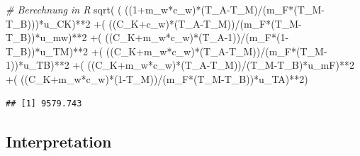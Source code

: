 \documentclass[class=article, crop=false]{standalone}
\newenvironment{Shaded}{\begin{snugshade}}{\end{snugshade}}
\newcommand{\CommentTok}[1]{\textcolor[rgb]{0.56,0.35,0.01}{\textit{#1}}}
\newcommand{\DecValTok}[1]{\textcolor[rgb]{0.00,0.00,0.81}{#1}}
\newcommand{\FunctionTok}[1]{\textcolor[rgb]{0.00,0.00,0.00}{#1}}
\newcommand{\NormalTok}[1]{#1}
\newcommand{\SpecialCharTok}[1]{\textcolor[rgb]{0.00,0.00,0.00}{#1}}
\begin{document}
\begin{Shaded}
\begin{Highlighting}[]
\CommentTok{\# Berechnung in R}
\FunctionTok{sqrt}\NormalTok{( ( ((}\DecValTok{1}\SpecialCharTok{+}\NormalTok{m\_w}\SpecialCharTok{*}\NormalTok{c\_w)}\SpecialCharTok{*}\NormalTok{(T\_A}\SpecialCharTok{{-}}\NormalTok{T\_M)}\SpecialCharTok{/}\NormalTok{(m\_F}\SpecialCharTok{*}\NormalTok{(T\_M}\SpecialCharTok{{-}}\NormalTok{T\_B)))}\SpecialCharTok{*}\NormalTok{u\_CK)}\SpecialCharTok{**}\DecValTok{2}
     \SpecialCharTok{+}\NormalTok{( ((C\_K}\SpecialCharTok{+}\NormalTok{c\_w)}\SpecialCharTok{*}\NormalTok{(T\_A}\SpecialCharTok{{-}}\NormalTok{T\_M))}\SpecialCharTok{/}\NormalTok{(m\_F}\SpecialCharTok{*}\NormalTok{(T\_M}\SpecialCharTok{{-}}\NormalTok{T\_B))}\SpecialCharTok{*}\NormalTok{u\_mw)}\SpecialCharTok{**}\DecValTok{2}
     \SpecialCharTok{+}\NormalTok{( ((C\_K}\SpecialCharTok{+}\NormalTok{m\_w}\SpecialCharTok{*}\NormalTok{c\_w)}\SpecialCharTok{*}\NormalTok{(T\_A}\DecValTok{{-}1}\NormalTok{))}\SpecialCharTok{/}\NormalTok{(m\_F}\SpecialCharTok{*}\NormalTok{(}\DecValTok{1}\SpecialCharTok{{-}}\NormalTok{T\_B))}\SpecialCharTok{*}\NormalTok{u\_TM)}\SpecialCharTok{**}\DecValTok{2}
     \SpecialCharTok{+}\NormalTok{( ((C\_K}\SpecialCharTok{+}\NormalTok{m\_w}\SpecialCharTok{*}\NormalTok{c\_w)}\SpecialCharTok{*}\NormalTok{(T\_A}\SpecialCharTok{{-}}\NormalTok{T\_M))}\SpecialCharTok{/}\NormalTok{(m\_F}\SpecialCharTok{*}\NormalTok{(T\_M}\DecValTok{{-}1}\NormalTok{))}\SpecialCharTok{*}\NormalTok{u\_TB)}\SpecialCharTok{**}\DecValTok{2}
     \SpecialCharTok{+}\NormalTok{( ((C\_K}\SpecialCharTok{+}\NormalTok{m\_w}\SpecialCharTok{*}\NormalTok{c\_w)}\SpecialCharTok{*}\NormalTok{(T\_A}\SpecialCharTok{{-}}\NormalTok{T\_M))}\SpecialCharTok{/}\NormalTok{(T\_M}\SpecialCharTok{{-}}\NormalTok{T\_B)}\SpecialCharTok{*}\NormalTok{u\_mF)}\SpecialCharTok{**}\DecValTok{2}
     \SpecialCharTok{+}\NormalTok{( ((C\_K}\SpecialCharTok{+}\NormalTok{m\_w}\SpecialCharTok{*}\NormalTok{c\_w)}\SpecialCharTok{*}\NormalTok{(}\DecValTok{1}\SpecialCharTok{{-}}\NormalTok{T\_M))}\SpecialCharTok{/}\NormalTok{(m\_F}\SpecialCharTok{*}\NormalTok{(T\_M}\SpecialCharTok{{-}}\NormalTok{T\_B))}\SpecialCharTok{*}\NormalTok{u\_TA)}\SpecialCharTok{**}\DecValTok{2}\NormalTok{)}
\end{Highlighting}
\end{Shaded}

\begin{verbatim}
## [1] 9579.743
\end{verbatim}

\hypertarget{interpretation}{%
\subsection{Interpretation}\label{interpretation}}
\end{document}
